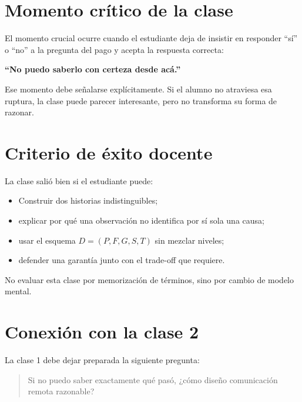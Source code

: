 \documentclass[variant=docente,cover=institutional,mode=screen]{ua-engineering-v6-article}
\begin{document}
\section{Momento crítico de la clase}\label{sec:momento-critico-de-la-clase}

El momento crucial ocurre cuando el estudiante deja de insistir en responder “sí” o “no” a la pregunta del pago y acepta la respuesta correcta:

\begin{center}
\textbf{“No puedo saberlo con certeza desde acá.”}
\end{center}

Ese momento debe señalarse explícitamente.
Si el alumno no atraviesa esa ruptura, la clase puede parecer interesante, pero no transforma su forma de razonar.

\section{Criterio de éxito docente}\label{sec:criterio-de-exito-docente}

La clase salió bien si el estudiante puede:

\begin{itemize}
\item Construir dos historias indistinguibles;
\item explicar por qué una observación no identifica por sí sola una causa;
\item usar el esquema $D=(P,F,G,S,T)$ sin mezclar niveles;
\item defender una garantía junto con el trade-off que requiere.
\end{itemize}

\begin{uawarn}
No evaluar esta clase por memorización de términos, sino por cambio de modelo mental.
\end{uawarn}

\section{Conexión con la clase 2}\label{sec:conexion-con-la-clase-2}

La clase 1 debe dejar preparada la siguiente pregunta:

\begin{quote}
Si no puedo saber exactamente qué pasó, ¿cómo diseño comunicación remota razonable?
\end{quote}
\end{document}
